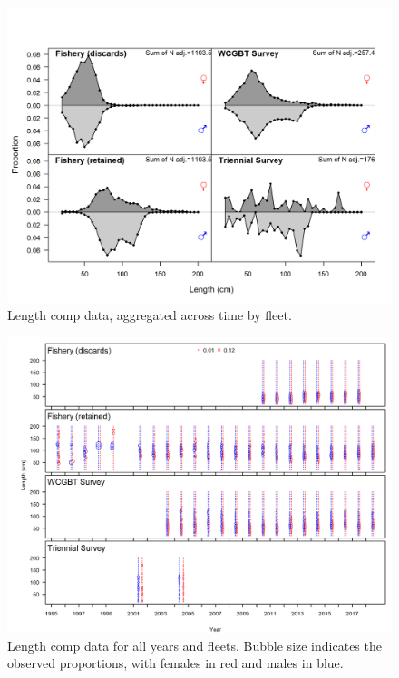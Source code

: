 \documentclass[12pt,]{article}
\begin{document}
\FloatBarrier

\FloatBarrier

\FloatBarrier

\FloatBarrier

\FloatBarrier

\FloatBarrier

\newpage

\begin{figure}
\centering
\includegraphics{r4ss/plots_mod1/comp_lendat__aggregated_across_time.png}
\caption{Length comp data, aggregated across time by fleet.
\label{fig:comp_lendat_aggregated_across_time}}
\end{figure}

\begin{figure}
\centering
\includegraphics{r4ss/plots_mod1/comp_lendat__multi-fleet_comparison.png}
\caption{Length comp data for all years and fleets. Bubble size
indicates the observed proportions, with females in red and males in
blue. \label{fig:comp_lendat__multi-fleet_comparison}}
\end{figure}
\end{document}
